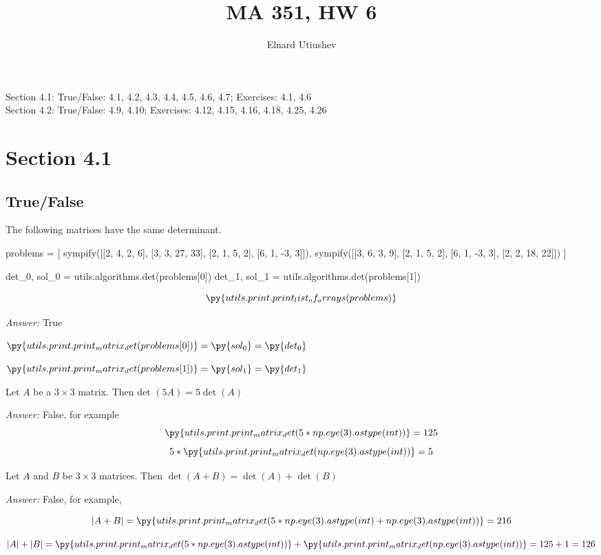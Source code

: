 \documentclass[letterpaper]{article}
\title{MA 351, HW 6}
\author{Elnard Utiushev}
\newcommand{\ans}{\textit{Answer: }}
\newenvironment{question}[2][Question]{\begin{trivlist}
\item[\hskip \labelsep {\bfseries #1}\hskip \labelsep {\bfseries #2.}]}{\end{trivlist}}
\begin{document}
\maketitle

Section 4.1: True/False: 4.1, 4.2, 4.3, 4.4, 4.5, 4.6, 4.7; Exercises: 4.1, 4.6 \\
Section 4.2: True/False: 4.9, 4.10; Exercises: 4.12, 4.15, 4.16, 4.18, 4.25, 4.26

\section{Section 4.1}
\subsection{True/False}

\begin{question}{4.1}
  The following matrices have the same determinant.

  \begin{pycode}
problems = [
  sympify([[2, 4, 2, 6], [3, 3, 27, 33], [2, 1, 5, 2], [6, 1, -3, 3]]),
  sympify([[3, 6, 3, 9], [2, 1, 5, 2], [6, 1, -3, 3], [2, 2, 18, 22]])
]

det_0, sol_0 = utils.algorithms.det(problems[0])
det_1, sol_1 = utils.algorithms.det(problems[1])
  \end{pycode}

  $$\py{utils.print.print_list_of_arrays(problems)}$$

  \ans True

  $\py{utils.print.print_matrix_det(problems[0])} = \py{sol_0} = \py{det_0}$

  $\py{utils.print.print_matrix_det(problems[1])} = \py{sol_1} = \py{det_1}$
\end{question}

\begin{question}{4.2}
  Let $A$ be a $3 \times 3$ matrix. Then det $(5 A)=5 \operatorname{det}(A)$

  \ans False, for example
  $$\py{utils.print.print_matrix_det(5 * np.eye(3).astype(int))} = 125$$
  $$5 * \py{utils.print.print_matrix_det(np.eye(3).astype(int))} = 5$$
\end{question}

\begin{question}{4.3}
  Let $A$ and $B$ be $3 \times 3$ matrices. Then $\operatorname{det}(A+B)=\operatorname{det}(A)+\operatorname{det}(B)$
  
  \ans False, for example,

  $$|A + B|
  = \py{utils.print.print_matrix_det(5 * np.eye(3).astype(int) + np.eye(3).astype(int))}
  = 216$$

  $$
  |A| + |B| = \py{utils.print.print_matrix_det(5 * np.eye(3).astype(int))} + \py{utils.print.print_matrix_det(np.eye(3).astype(int))} = 125 + 1 = 126
  $$

\end{question}
\end{document}

